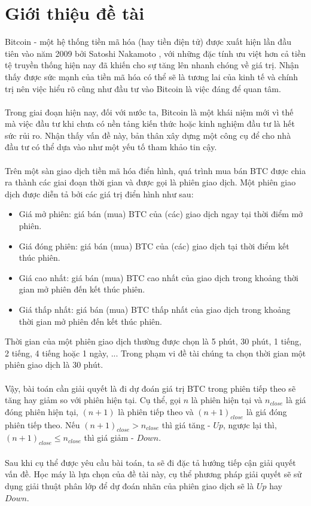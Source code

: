 \section{Giới thiệu đề tài}
Bitcoin - một hệ thống tiền mã hóa (hay tiền điện tử) được xuất hiện lần đầu tiên 
vào năm 2009 bởi Satoshi Nakamoto \cite{BitcoinPaper}, với những đặc tính ưu việt hơn cả tiền tệ 
truyền thống hiện nay đã khiến cho sự tăng lên nhanh chóng về giá trị. Nhận thấy 
được sức mạnh của tiền mã hóa có thể sẽ là tương lai của kinh tế và chính trị 
nên việc hiểu rõ cũng như đầu tư vào Bitcoin là việc đáng để quan tâm.\\\\
Trong giai đoạn hiện nay, đối với nước ta, Bitcoin là một khái niệm mới vì thế 
mà việc đầu tư khi chưa có nền tảng kiến thức hoặc kinh nghiệm đầu tư là hết 
sức rủi ro. Nhận thấy vấn đề này, bản thân xây dựng một công cụ để cho nhà đầu 
tư có thể dựa vào như một yếu tố tham khảo tin cậy.\\\\
Trên một sàn giao dịch tiền mã hóa điển hình, quá trình mua bán BTC được chia ra 
thành các giai đoạn thời gian và được gọi là phiên giao dịch. Một phiên giao dịch 
được diễn tả bởi các giá trị điển hình như sau:
\begin{itemize}
\item Giá mở phiên: giá bán (mua) BTC của (các) giao dịch ngay tại thời 
điểm mở phiên.
\item Giá đóng phiên: giá bán (mua) BTC của (các) giao dịch tại thời điểm 
kết thúc phiên.
\item Giá cao nhất: giá bán (mua) BTC cao nhất của giao dịch trong khoảng 
thời gian mở phiên đến kết thúc phiên.
\item Giá thấp nhất: giá bán (mua) BTC thấp nhất của giao dịch trong khoảng 
thời gian mở phiên đến kết thúc phiên.
\end{itemize}
Thời gian của một phiên giao dịch thường được chọn là 5 phút, 30 phút, 1 tiếng, 2 tiếng, 
4 tiếng hoặc 1 ngày, ... 
Trong phạm vi đề tài chúng ta chọn thời gian một phiên giao dịch là 30 phút.\\\\
Vậy, bài toán cần giải quyết là đi dự đoán giá trị BTC trong phiên tiếp theo sẽ tăng 
hay giảm so với phiên hiện tại. Cụ thể, gọi $n$ là phiên hiện tại và $n_{close}$ 
là giá đóng phiên hiện tại, $(n+1)$ là phiên tiếp theo và $(n+1)_{close}$ là giá đóng 
phiên tiếp theo. Nếu $(n+1)_{close} > n_{close}$ thì giá tăng - $Up$, ngược lại thì, 
$(n+1)_{close} \leq n_{close}$ thì giá giảm - $Down$.\\\\
Sau khi cụ thể được yêu cầu bài toán, ta sẽ đi đặc tả hướng tiếp cận giải quyết 
vấn đề. Học máy là lựa chọn của đề tài này, cụ thể phương pháp giải quyết 
sẽ sử dụng giải thuật phân lớp để dự đoán nhãn của phiên giao dịch sẽ là $Up$ 
hay $Down$.